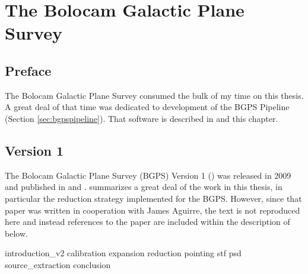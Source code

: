 
\chapter{The Bolocam Galactic Plane Survey}
\label{ch:v2}

\section{Preface}
The Bolocam Galactic Plane Survey consumed the bulk of my time on this thesis.
A great deal of that time was dedicated to development of the BGPS Pipeline
(Section \ref{sec:bgpspipeline}).  That software is described in \citet{Aguirre2011}
and this chapter.

\section{Version 1}
The Bolocam Galactic Plane Survey (BGPS) Version 1 (\vone) was released in 2009 and published in
\citet{Aguirre2011} and \citet{Rosolowsky2010}.  \citet{Aguirre2011} summarizes 
a great deal of the work in this thesis, in particular the reduction strategy
implemented for the BGPS.  However, since that paper was written in cooperation
with James Aguirre, the text is not reproduced here and instead references to
the paper are included within the description of \vtwo below.

{introduction_v2}
{calibration} %
{expansion}
{reduction} %
{pointing} %
{stf} %
{psd} 
{source_extraction} %
{conclusion}





